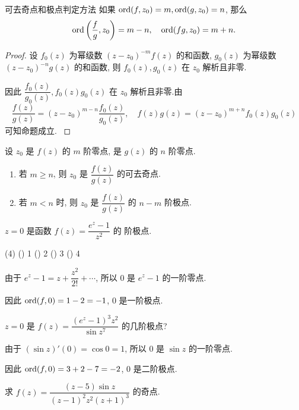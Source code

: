 \begin{theorem}{可去奇点和极点判定方法}
	如果 ${\mathrm{ord}}(f,z_0)=m,{\mathrm{ord}}(g,z_0)=n$, 那么
	\[{\mathrm{ord}}\left(\frac fg,z_0\right)=m-n,\quad{\mathrm{ord}}(fg,z_0)=m+n.\]
\end{theorem}

\begin{proof}
		设 $f_0(z)$ 为幂级数 $(z-z_0)^{-m}f(z)$ 的和函数, $g_0(z)$ 为幂级数 $(z-z_0)^{-n}g(z)$ 的和函数,
	{则 $f_0(z),g_0(z)$ 在 $z_0$ 解析且非零.
	}%

	{因此 $\dfrac{f_0(z)}{g_0(z)},f_0(z)g_0(z)$ 在 $z_0$ 解析且非零.由
		\[\frac{f(z)}{g(z)}=(z-z_0)^{m-n}\frac{f_0(z)}{g_0(z)},\quad
		f(z)g(z)=(z-z_0)^{m+n}f_0(z)g_0(z)\]
		可知命题成立.\qedhere
	}
\end{proof}

\begin{corollary}
	设 $z_0$ 是 $f(z)$ 的 $m$ 阶零点, 是 $g(z)$ 的 $n$ 阶零点.
	\begin{enumerate}
		\item 若 $m\ge n$, 则 $z_0$ 是 $\dfrac{f(z)}{g(z)}$ 的可去奇点.
		\item 若 $m<n$ 时, 则 $z_0$ 是 $\dfrac{f(z)}{g(z)}$ 的 $n-m$ 阶极点.
	\end{enumerate}
\end{corollary}

\begin{example}
	$z=0$ 是函数 $f(z)=\dfrac{e^z-1}{z^2}$ 的 阶极点.
	\begin{exchoice}(4)
		() 1
		() 2
		() 3
		() 4
	\end{exchoice}
\end{example}

\begin{solution}
		由于 $e^z-1=z+\dfrac{z^2}{2!}+\cdots$, 所以 $0$ 是 $e^z-1$ 的一阶零点.

	{因此 ${\mathrm{ord}}(f,0)=1-2=-1$, $0$ 是一阶极点.
	}
\end{solution}

\begin{example}
	$z=0$ 是 $f(z)=\dfrac{(e^z-1)^3z^2}{\sin z^7}$ 的几阶极点?
\end{example}

\begin{solution}
		由于 $(\sin z)'(0)=\cos 0=1$, 所以 $0$ 是 $\sin z$ 的一阶零点.

	{因此 ${\mathrm{ord}}(f,0)=3+2-7=-2$, $0$ 是二阶极点.
	}
\end{solution}

\begin{exercise}
	求 $f(z)=\dfrac{(z-5)\sin z}{(z-1)^2z^2(z+1)^3}$ 的奇点.
\end{exercise}

